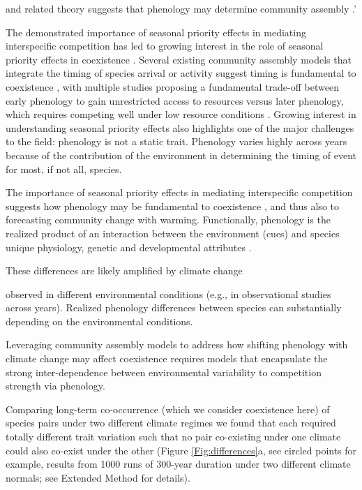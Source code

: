 and related theory suggests that phenology may determine community assembly \citep{wolkovich2021phenological,levine2022competition}.'



The demonstrated importance of seasonal priority effects in mediating interspecific competition has led to growing interest in the role of seasonal priority effects in coexistence \citep{Diez_2024, Blackford_2020}. Several existing community assembly models that integrate the timing of species arrival or activity suggest timing is fundamental to coexistence \citep{volkerisaj}, with multiple studies proposing a fundamental trade-off between early phenology to gain unrestricted access to  resources versus later phenology, which requires competing well under low resource conditions \citep{wolkovich2021phenological,levine2022competition}. Growing interest in understanding seasonal priority effects also highlights one of the major challenges to the field: phenology is not a static trait. Phenology varies highly across years because of the contribution of the environment in determining the timing of event for most, if not all, species. 


The importance of seasonal priority effects in mediating interspecific competition suggests how phenology may be fundamental to coexistence \citep{Diez_2024, Blackford_2020}, and thus also to forecasting community change with warming. Functionally, phenology is the realized product of an interaction between the environment (cues) and species unique physiology, genetic and developmental attributes \citep{DONOHUE2005}. 



These differences are likely amplified by climate change

observed in different environmental conditions (e.g., in observational studies across years). Realized phenology differences between species can substantially depending on the environmental conditions.

Leveraging community assembly models to address how shifting phenology with climate change may affect coexistence requires models that encapsulate the strong inter-dependence between environmental variability to competition strength via phenology.



Comparing long-term co-occurrence (which we consider coexistence here) of species pairs under two different climate regimes we found that each required totally different trait variation such that no pair co-existing under one climate could also co-exist under the other (Figure \ref{Fig:differences}a, see circled points for example, results from 1000 runs of 300-year duration under two different climate normals; see Extended Method for details). 


